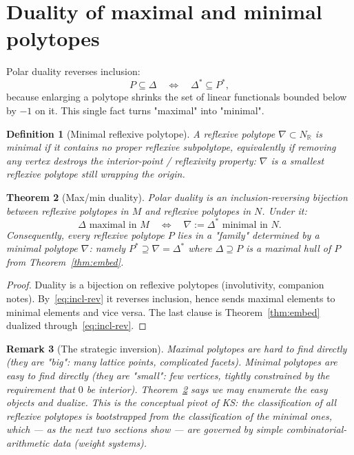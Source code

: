 \documentclass{amsart}
\newtheorem{theorem}{Theorem}[section]
\newtheorem{definition}[theorem]{Definition}
\newtheorem{remark}[theorem]{Remark}
\begin{document}
\section{Duality of maximal and minimal polytopes}\label{sec:dual}

Polar duality reverses inclusion:
\begin{equation}\label{eq:incl-rev}
  P \subseteq \Delta \quad\Longleftrightarrow\quad \Delta^* \subseteq P^*,
\end{equation}
because enlarging a polytope shrinks the set of linear functionals bounded
below by $-1$ on it. This single fact turns "maximal" into "minimal".

\begin{definition}[Minimal reflexive polytope]\label{def:min}
A reflexive polytope $\nabla \subset N_{\mathbb{R}}$ is \emph{minimal} if it
contains no proper reflexive subpolytope, equivalently if removing any
vertex destroys the interior-point / reflexivity property: $\nabla$ is a
smallest reflexive polytope still wrapping the origin.
\end{definition}

\begin{theorem}[Max/min duality]\label{thm:maxmin}
Polar duality is an inclusion-reversing bijection between reflexive
polytopes in $M$ and reflexive polytopes in $N$. Under it:
\begin{equation}
  \Delta \text{ maximal in } M
  \quad\Longleftrightarrow\quad
  \nabla := \Delta^* \text{ minimal in } N.
\end{equation}
Consequently, every reflexive polytope $P$ lies in a "family" determined by
a minimal polytope $\nabla$: namely $P^* \supseteq \nabla = \Delta^*$ where
$\Delta \supseteq P$ is a maximal hull of $P$ from
Theorem~\ref{thm:embed}.
\end{theorem}

\begin{proof}
Duality is a bijection on reflexive polytopes (involutivity, companion
notes). By~\eqref{eq:incl-rev} it reverses inclusion, hence sends maximal
elements to minimal elements and vice versa. The last clause is
Theorem~\ref{thm:embed} dualized through~\eqref{eq:incl-rev}.
\end{proof}

\begin{remark}[The strategic inversion]
Maximal polytopes are hard to find directly (they are "big": many lattice
points, complicated facets). Minimal polytopes are easy to find directly
(they are "small": few vertices, tightly constrained by the requirement
that $0$ be interior). Theorem~\ref{thm:maxmin} says we may enumerate the
\emph{easy} objects and dualize. This is the conceptual pivot of KS: the
classification of all reflexive polytopes is bootstrapped from the
classification of the minimal ones, which --- as the next two sections show
--- are governed by simple combinatorial-arithmetic data (weight systems).
\end{remark}
\end{document}
